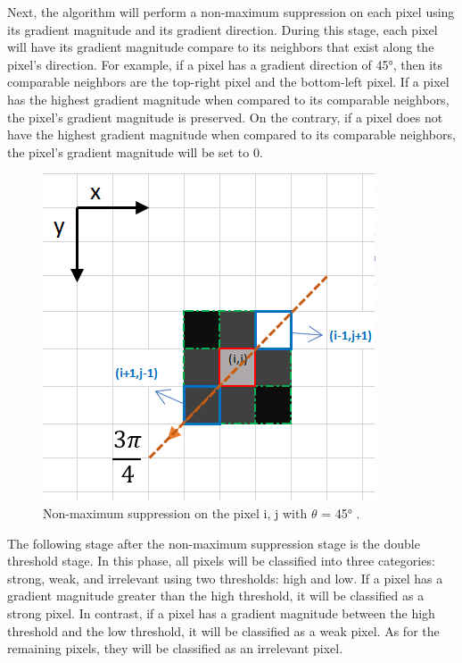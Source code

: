 \documentclass[conference]{IEEEtran}
\begin{document}
Next, the algorithm will perform a non-maximum suppression on each pixel using its gradient magnitude and its gradient direction. During this stage, each pixel will have its gradient magnitude compare to its neighbors that exist along the pixel's direction. For example, if a pixel has a gradient direction of 45°, then its comparable neighbors are the top-right pixel and the bottom-left pixel. If a pixel has the highest gradient magnitude when compared to its comparable neighbors, the pixel's gradient magnitude is preserved. On the contrary, if a pixel does not have the highest gradient magnitude when compared to its comparable neighbors, the pixel's gradient magnitude will be set to 0.
\begin{figure}[!htb]
    \centering
    \includegraphics[scale = 0.3]{CED_nms.png}
    \caption{Non-maximum suppression on the pixel i, j with $\theta$ = 45° \cite{sofiane-sahir:2019}.}
\end{figure}

The following stage after the non-maximum suppression stage is the double threshold stage. In this phase, all pixels will be classified into three categories: strong, weak, and irrelevant using two thresholds: high and low. If a pixel has a gradient magnitude greater than the high threshold, it will be classified as a strong pixel. In contrast, if a pixel has a gradient magnitude between the high threshold and the low threshold, it will be classified as a weak pixel. As for the remaining pixels, they will be classified as an irrelevant pixel.
\end{document}
